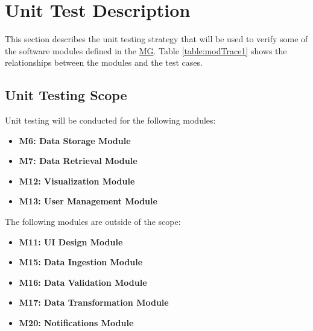 \documentclass[12pt, titlepage]{article}
\begin{document}
\section{Unit Test Description} \label{unitTests}

This section describes the unit testing strategy that will be used to verify
some of the software modules defined in the
\href{https://github.com/SumanyaG/Alkalytics/blob/main/docs/Design/MG.pdf}{MG}.
Table \ref{table:modTrace1} shows the relationships between the modules and the
test cases.

\begin{comment}
\wss{Reference your MIS (detailed design document) and explain your overall
philosophy for test case selection.}  

\wss{To save space and time, it may be an option to provide less detail in this
section.  
For the unit tests you can potentially layout your testing strategy here.  That
is, you can explain how tests will be selected for each module.  For instance,
your test building approach could be test cases for each access program,
including one test for normal behaviour and as many tests as needed for edge
cases.  Rather than create the details of the input and output here, you could
point to the unit testing code.  For this to work, you code needs to be
well-documented, with meaningful names for all of the tests.} 
\end{comment}

\subsection{Unit Testing Scope}

Unit testing will be conducted for the following modules:
\begin{itemize}
  \item \textbf{M6: Data Storage Module}
  \item \textbf{M7: Data Retrieval Module}
  \item \textbf{M12: Visualization Module}
  \item \textbf{M13: User Management Module}
\end{itemize}

\noindent The following modules are outside of the scope:
\begin{itemize}
  \item \textbf{M11: UI Design Module}
  \item \textbf{M15: Data Ingestion Module}
  \item \textbf{M16: Data Validation Module}
  \item \textbf{M17: Data Transformation Module}
  \item \textbf{M20: Notifications Module}
\end{itemize}
\end{document}
